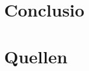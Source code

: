 \documentclass[a4paper,12pt]{scrreprt}
\begin{document}
\chapter{Conclusio}

\chapter{Quellen}
\end{document}
